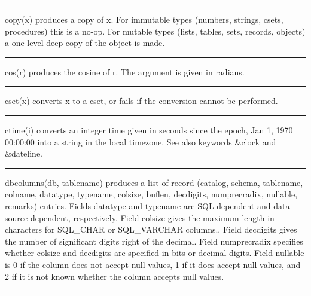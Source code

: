 \bigskip\hrule\vspace{0.1cm}

\noindent
{}copy(x) produces a copy of x. For immutable types
(numbers, strings, csets, procedures) this is a no-op. For mutable
types (lists, tables, sets, records, objects) a one-level deep copy of
the object is made.

\bigskip\hrule\vspace{0.1cm}

\noindent
{}cos(r) produces the cosine of r. The argument is given in
radians.

\bigskip\hrule\vspace{0.1cm}

\noindent
{}cset(x) converts x to a cset, or fails if the
conversion cannot be performed.

\bigskip\hrule\vspace{0.1cm}

\noindent
{}ctime(i) converts an integer time
given in seconds since the epoch, Jan 1, 1970 00:00:00 into a string in
the local timezone. See also keywords \&clock and \&dateline.

\bigskip\hrule\vspace{0.1cm}

\noindent
{}dbcolumns(db, tablename) produces a list of record
(catalog, schema, tablename, colname, datatype, typename, colsize,
buflen, decdigits, numprecradix, nullable, remarks) entries. Fields
\textsf{datatype} and \textsf{typename} are SQL-dependent and data
source dependent, respectively. Field \textsf{colsize} gives the
maximum length in characters for SQL\_CHAR or SQL\_VARCHAR columns..
Field \textsf{decdigits} gives the number of significant digits right
of the decimal. Field \textsf{numprecradix} specifies whether
\textsf{colsize} and \textsf{decdigits} are specified in bits or
decimal digits. Field \textsf{nullable} is 0 if the column does not
accept null values, 1 if it does accept null values, and 2 if it is not
known whether the column accepts null values.

\bigskip\hrule\vspace{0.1cm}

